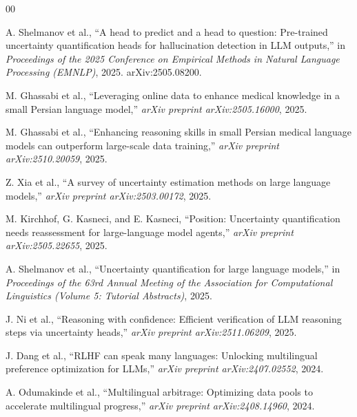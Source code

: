 \documentclass[conference]{IEEEtran}
\begin{document}
\begin{thebibliography}{00}


A. Shelmanov et al., ``A head to predict and a head to question: Pre-trained uncertainty quantification heads for hallucination detection in LLM outputs,'' in \emph{Proceedings of the 2025 Conference on Empirical Methods in Natural Language Processing (EMNLP)}, 2025. arXiv:2505.08200.


M. Ghassabi et al., ``Leveraging online data to enhance medical knowledge in a small Persian language model,'' \emph{arXiv preprint arXiv:2505.16000}, 2025.


M. Ghassabi et al., ``Enhancing reasoning skills in small Persian medical language models can outperform large-scale data training,'' \emph{arXiv preprint arXiv:2510.20059}, 2025.


Z. Xia et al., ``A survey of uncertainty estimation methods on large language models,'' \emph{arXiv preprint arXiv:2503.00172}, 2025.


M. Kirchhof, G. Kasneci, and E. Kasneci, ``Position: Uncertainty quantification needs reassessment for large-language model agents,'' \emph{arXiv preprint arXiv:2505.22655}, 2025.


A. Shelmanov et al., ``Uncertainty quantification for large language models,'' in \emph{Proceedings of the 63rd Annual Meeting of the Association for Computational Linguistics (Volume 5: Tutorial Abstracts)}, 2025.


J. Ni et al., ``Reasoning with confidence: Efficient verification of LLM reasoning steps via uncertainty heads,'' \emph{arXiv preprint arXiv:2511.06209}, 2025.


J. Dang et al., ``RLHF can speak many languages: Unlocking multilingual preference optimization for LLMs,'' \emph{arXiv preprint arXiv:2407.02552}, 2024.


A. Odumakinde et al., ``Multilingual arbitrage: Optimizing data pools to accelerate multilingual progress,'' \emph{arXiv preprint arXiv:2408.14960}, 2024.



\end{thebibliography}
\end{document}
